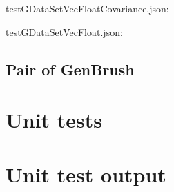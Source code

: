 testGDataSetVecFloatCovariance.json:
\begin{scriptsize}
\begin{ttfamily}

\end{ttfamily}
\end{scriptsize}

testGDataSetVecFloat.json:
\begin{scriptsize}
\begin{ttfamily}

\end{ttfamily}
\end{scriptsize}

\subsection{Pair of GenBrush}

\begin{scriptsize}
\begin{ttfamily}

\end{ttfamily}
\end{scriptsize}

\section{Unit tests}

\begin{scriptsize}
\begin{ttfamily}

\end{ttfamily}
\end{scriptsize}

\section{Unit test output}

\begin{scriptsize}
\begin{ttfamily}

\end{ttfamily}
\end{scriptsize}


